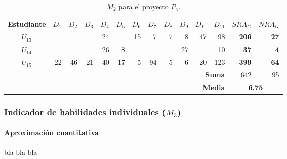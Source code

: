 \begin{table}[h]
\centering
\begin{tabular}{|c|r|r|r|r|r|r|r|r|r|r|r|r|r|}
\hline
\textbf{Estudiante} & \textbf{$D_1$} & \textbf{$D_2$} & \textbf{$D_3$} & \textbf{$D_4$} & \textbf{$D_5$} & \textbf{$D_6$} & \textbf{$D_7$} & \textbf{$D_8$} & \textbf{$D_9$} & \textbf{$D_{10}$} & \textbf{$D_{11}$} &  \textbf{$SRA_G$ } & \textbf{$NRA_G$ } \\ \hline
\hline
$U_{13}$ &   &   &   & 24 &      & 15  & 7   & 7   & 8   & 47  & 98  & \textbf{206} & \textbf{27} \\ \hline
$U_{14}$ &   &   &   & 26 & 8   &      &      &      &  27 &      & 10 &  \textbf{37}  & \textbf{4} \\ \hline
$U_{15}$ & 22 &  46 & 21   &  40 & 17  & 5 & 94 &  5   & 6  &  20  &  123 & \textbf{399} & \textbf{64} \\ \hline
\hline
\hline
\multicolumn{12}{|r|}{\textbf{Suma}} & 642 &  95 \\ \hline
\multicolumn{12}{|r|}{\textbf{Media}} & \multicolumn{2}{|c|}{\textbf{6.75}} \\ \hline
\end{tabular}
\caption{$M_2$  para el proyecto $P_{4}$.}
\label{table:4-project-peers-grades}
\end{table}


\subsubsection{Indicador de habilidades individuales ($M_3$)}

\paragraph*{Aproximación cuantitativa}

bla bla bla

